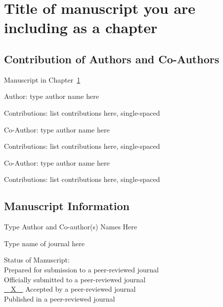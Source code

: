 
\chapter{Title of manuscript you are\\ including as a chapter}\label{CH:manuscript}

\section{Contribution of Authors and Co-Authors}

\noindent Manuscript in Chapter~\ref{CH:manuscript}

\noindent Author: type author name here

\begin{singlespace}
  \noindent Contributions: list contributions here, single-spaced
\end{singlespace}

\noindent Co-Author: type author name here

\begin{singlespace}
  \noindent Contributions: list contributions here, single-spaced
\end{singlespace}

\noindent Co-Author: type author name here

\begin{singlespace}
  \noindent Contributions: list contributions here, single-spaced
\end{singlespace}


\newpage

\section{Manuscript Information}

\noindent Type Author and Co-author(s) Names Here

\noindent Type name of journal here

\begin{singlespace}
  \noindent Status of Manuscript: \\ %
  \underline{\phantom{~~X~~}} Prepared for submission to a peer-reviewed journal\\
  \underline{\phantom{~~X~~}} Officially submitted to a peer-reviewed journal\\
  \underline{~~X~~} Accepted by a peer-reviewed journal\\
  \underline{\phantom{~~X~~}} Published in a peer-reviewed journal
\end{singlespace}

